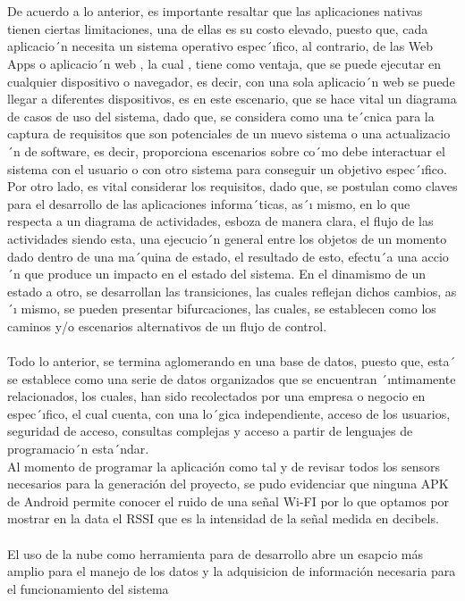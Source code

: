 \documentclass[conference,compsoc,onecolumn]{IEEEtran}
\begin{document}
\\
\\
De acuerdo a lo anterior, es importante resaltar que las aplicaciones nativas tienen ciertas limitaciones, una de ellas es su  costo  elevado,  puesto  que,  cada  aplicacio´n  necesita  un  sistema  operativo  espec´ıfico,  al  contrario,  de  las  Web  Apps  o aplicacio´n web , la cual , tiene como ventaja, que se puede ejecutar en cualquier dispositivo o navegador, es decir, con una sola aplicacio´n web se puede llegar a diferentes dispositivos, es en este escenario, que se hace vital un diagrama de casos de uso del sistema, dado que, se considera como una te´cnica para la captura de requisitos que son potenciales de un nuevo sistema  o  una  actualizacio´n  de  software,  es  decir,  proporciona  escenarios  sobre  co´mo  debe  interactuar  el  sistema  con  el usuario o con otro sistema para conseguir un objetivo espec´ıfico. Por otro lado, es vital considerar los requisitos, dado que, se postulan  como claves para  el desarrollo de  las aplicaciones informa´ticas, as´ı mismo,  en lo que  respecta a un  diagrama de  actividades,  esboza  de  manera  clara,  el  flujo  de  las  actividades  siendo  esta,  una  ejecucio´n  general  entre  los  objetos  de un momento dado dentro de una ma´quina de estado, el resultado de esto, efectu´a una accio´n que produce un impacto en el estado del sistema. En el dinamismo de un estado a otro, se desarrollan las transiciones, las cuales reflejan dichos cambios, as´ı mismo, se pueden presentar bifurcaciones, las cuales, se establecen como los caminos y/o escenarios alternativos de un flujo de control.
\\
\\
Todo lo anterior, se termina aglomerando en una base de datos, puesto que, esta´ se establece como una serie de datos organizados que se encuentran ´ıntimamente relacionados, los cuales, han sido recolectados por una empresa o negocio en espec´ıfico, el cual cuenta, con una lo´gica independiente, acceso de los usuarios, seguridad de acceso, consultas complejas y acceso a partir de lenguajes de programacio´n esta´ndar.
\\
Al momento de programar la aplicación como tal y de revisar todos los sensors necesarios para la generación del proyecto, se pudo evidenciar que ninguna APK de Android permite conocer el ruido de una señal Wi-FI por lo que optamos por mostrar en la data el RSSI que es la intensidad de la señal medida en decibels.
\\
\\
El uso de la nube como herramienta para de desarrollo abre un esapcio más amplio para el manejo de los datos y la adquisicion de información necesaria para el funcionamiento del sistema
\end{document}
